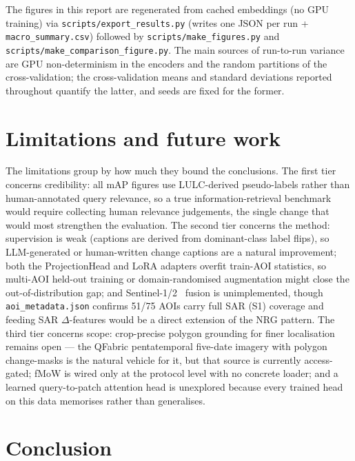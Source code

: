 \documentclass{article}
\begin{document}
The figures in this report are regenerated from cached embeddings (no GPU
training) via \texttt{scripts/\allowbreak{}export\_\allowbreak{}results.py} (writes one JSON per run +
\texttt{macro\_\allowbreak{}summary.csv}) followed by \texttt{scripts/\allowbreak{}make\_\allowbreak{}figures.py} and
\texttt{scripts/\allowbreak{}make\_\allowbreak{}comparison\_\allowbreak{}figure.py}. The main sources of run-to-run
variance are GPU non-determinism in the encoders and the random partitions of the
cross-validation; the cross-validation means and standard deviations reported
throughout quantify the latter, and seeds are fixed for the former.


\section{Limitations and future work}
\label{sec:future}

The limitations group by how much they bound the conclusions. The first tier
concerns credibility: all mAP figures use LULC-derived pseudo-labels rather than
human-annotated query relevance, so a true information-retrieval benchmark would
require collecting human relevance judgements, the single change that would most
strengthen the evaluation. The second tier concerns the method: supervision is
weak (captions are derived from dominant-class label flips), so LLM-generated or
human-written change captions are a natural improvement; both the ProjectionHead
and LoRA adapters overfit train-AOI statistics, so multi-AOI held-out training or
domain-randomised augmentation might close the out-of-distribution gap; and
Sentinel-1/2~\cite{sentinel2} fusion is unimplemented, though
\texttt{aoi\_metadata.json} confirms 51/75 AOIs carry full SAR (S1) coverage and
feeding SAR $\Delta$-features would be a direct extension of the NRG pattern. The
third tier concerns scope: crop-precise polygon grounding for finer localisation
remains open --- the QFabric pentatemporal five-date imagery with polygon
change-masks is the natural vehicle for it, but that source is currently
access-gated; fMoW is wired only at the protocol level with no concrete loader;
and a learned query-to-patch attention head is unexplored because every trained
head on this data memorises rather than generalises.


\section{Conclusion}
\label{sec:conclusion}
\end{document}
